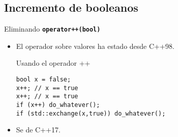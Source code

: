 \subsection{Incremento de booleanos}

\begin{frame}[t,fragile]{Eliminando \textbf{\texttt{operator++(bool)}}}
\begin{itemize}
  \item El operador \cppkey{++} sobre valores  ha estado
         desde C++98.
\vfill
\begin{block}{Usando el operador ++}
\begin{lstlisting}
bool x = false;
x++; // x == true
x++; // x == true
if (x++) do_whatever();
if (std::exchange(x,true)) do_whatever();
\end{lstlisting}
\end{block}
\vfill
  \item Se  de C++17.
\end{itemize}
\end{frame}
